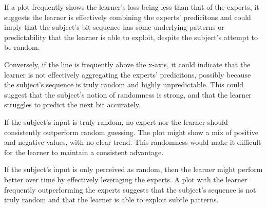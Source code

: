If a plot frequently shows the learner's loss being less than that of the experts, it suggests the learner is effectively combining the experts' predicitons and could imply that the subject's bit sequence has some underlying patterns or predictability that the learner is able to exploit, despite the subject's attempt to be random.

Conversely, if the line is frequently above the x-axis, it could indicate that the learner is not effectively aggregating the experts' predicitons, possibly because the subject's sequence is truly random and highly unpredictable. This could suggest that the subject's notion of randomness is strong, and that the learner struggles to predict the next bit accurately.

If the subject's input is truly random, no expert nor the learner should consistently outperform random guessing. The plot might show a mix of positive and negative values, with no clear trend. This randomness would make it difficult for the learner to maintain a consistent advantage.

If the subject's input is only perceived as random, then the learner might perform better over time by effectively leveraging the experts. A plot with the learner frequently outperforming the experts suggests that the subject's sequence is not truly random and that the learner is able to exploit subtle patterns.